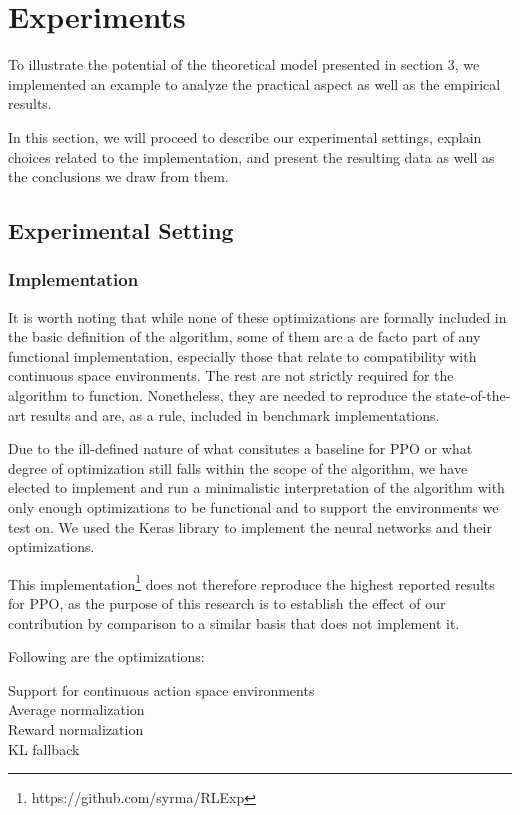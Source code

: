 \section{Experiments}

	To illustrate the potential of the theoretical model presented in section 3, we implemented an example to analyze the practical aspect as well as the empirical results.

In this section, we will proceed to describe our experimental settings, explain choices related to the implementation, and present the resulting data as well as the conclusions we draw from them.

\subsection{Experimental Setting}

\subsubsection{Implementation}

\cite{shengyi2022the37implementation}

It is worth  noting that while none of these optimizations are formally included in the basic definition of the algorithm, some of them are a de facto part of any functional implementation, especially those that relate to compatibility with  continuous space environments. The rest are not strictly required for the algorithm to function. Nonetheless, they are needed to reproduce the state-of-the-art results and are, as a rule, included in benchmark implementations. %

Due to the ill-defined nature of what consitutes a baseline for PPO or what degree of optimization still falls within the scope of the algorithm, we have elected to implement and run a minimalistic interpretation of the algorithm with only enough optimizations to be functional and to support the environments we test on. We used the Keras library to implement the neural networks and their optimizations.

This implementation\footnote{https://github.com/syrma/RLExp} does not therefore reproduce the highest reported results for PPO, as the purpose of this research is to establish the effect of our contribution by comparison to a similar basis that does not implement it.

Following are the optimizations:

\begin{description}
\item[Support for continuous action space environments]
\item[Average normalization]
\item[Reward normalization]
\item[KL fallback]
\end{description}

